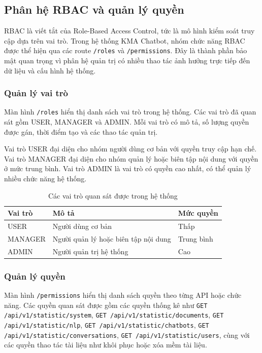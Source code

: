 \subsection{Phân hệ RBAC và quản lý quyền}

RBAC là viết tắt của Role-Based Access Control, tức là mô hình kiểm soát truy cập dựa trên vai trò. Trong hệ thống KMA Chatbot, nhóm chức năng RBAC được thể hiện qua các route \texttt{/roles} và \texttt{/permissions}. Đây là thành phần bảo mật quan trọng vì phân hệ quản trị có nhiều thao tác ảnh hưởng trực tiếp đến dữ liệu và cấu hình hệ thống.

\subsubsection{Quản lý vai trò}

Màn hình \texttt{/roles} hiển thị danh sách vai trò trong hệ thống. Các vai trò đã quan sát gồm USER, MANAGER và ADMIN. Mỗi vai trò có mô tả, số lượng quyền được gán, thời điểm tạo và các thao tác quản trị.

Vai trò USER đại diện cho nhóm người dùng cơ bản với quyền truy cập hạn chế. Vai trò MANAGER đại diện cho nhóm quản lý hoặc biên tập nội dung với quyền ở mức trung bình. Vai trò ADMIN là vai trò có quyền cao nhất, có thể quản lý nhiều chức năng hệ thống.

\begin{table}[H]
\centering
\caption{Các vai trò quan sát được trong hệ thống}
\label{tab:roles-observed}
\begin{tabular}{|p{3cm}|p{6cm}|p{4cm}|}
\hline
\textbf{Vai trò} & \textbf{Mô tả} & \textbf{Mức quyền} \\ \hline
USER & Người dùng cơ bản & Thấp \\ \hline
MANAGER & Người quản lý hoặc biên tập nội dung & Trung bình \\ \hline
ADMIN & Người quản trị hệ thống & Cao \\ \hline
\end{tabular}
\end{table}

\subsubsection{Quản lý quyền}

Màn hình \texttt{/permissions} hiển thị danh sách quyền theo từng API hoặc chức năng. Các quyền quan sát được gồm các quyền thống kê như \texttt{GET /api/v1/statistic/system}, \texttt{GET /api/v1/statistic/documents}, \texttt{GET /api/v1/statistic/nlp}, \texttt{GET /api/v1/statistic/chatbots}, \texttt{GET /api/v1/statistic/conversations}, \texttt{GET /api/v1/statistic/users}, cùng với các quyền thao tác tài liệu như khôi phục hoặc xóa mềm tài liệu.

